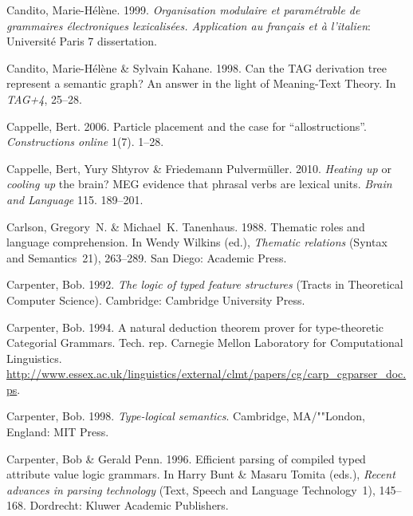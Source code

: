 \begin{thebibliography}{1420}
Candito, Marie-H{\'e}l{\`e}ne. 1999.
\newblock \emph{{Organisation modulaire et param{\'e}trable de grammaires
  {\'e}lectroniques lexicalis{\'e}es. Application au fran{\c c}ais et {\`a}
  l'italien}}: Universit{\'e} Paris 7 dissertation.

Candito, Marie-H{\'e}l{\`e}ne \& Sylvain Kahane. 1998.
\newblock Can the {TAG} derivation tree represent a semantic graph? {An} answer
  in the light of {Meaning-Text Theory}.
\newblock In \emph{{TAG+4}}, 25--28.

Cappelle, Bert. 2006.
\newblock Particle placement and the case for ``allostructions''.
\newblock \emph{Constructions online} 1(7). 1--28.

Cappelle, Bert, Yury Shtyrov \& Friedemann Pulverm{\"u}ller. 2010.
\newblock \emph{Heating up} or \emph{cooling up} the brain? {MEG} evidence that
  phrasal verbs are lexical units.
\newblock \emph{Brain and Language} 115. 189--201.

Carlson, Gregory~N. \& Michael~K. Tanenhaus. 1988.
\newblock Thematic roles and language comprehension.
\newblock In Wendy Wilkins (ed.), \emph{Thematic relations} (Syntax and
  Semantics~21), 263--289. San Diego: Academic Press.

Carpenter, Bob. 1992.
\newblock \emph{The logic of typed feature structures}  (Tracts in Theoretical
  Computer Science).
\newblock Cambridge: Cambridge University Press.

Carpenter, Bob. 1994.
\newblock A natural deduction theorem prover for type-theoretic {Categorial
  Grammars}.
\newblock Tech. rep. Carnegie Mellon Laboratory for Computational Linguistics.
\newblock
  \urlprefix\url{http://www.essex.ac.uk/linguistics/external/clmt/papers/cg/carp_cgparser_doc.ps}.

Carpenter, Bob. 1998.
\newblock \emph{Type-logical semantics}.
\newblock Cambridge, MA/""London, England: MIT Press.

Carpenter, Bob \& Gerald Penn. 1996.
\newblock Efficient parsing of compiled typed attribute value logic grammars.
\newblock In Harry Bunt \& Masaru Tomita (eds.), \emph{Recent advances in
  parsing technology} (Text, Speech and Language Technology~1), 145--168.
  Dordrecht: Kluwer Academic Publishers.


\end{thebibliography}
